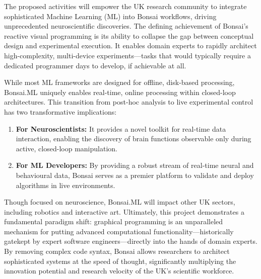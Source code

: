 The proposed activities will empower the UK research community to integrate
sophisticated Machine Learning (ML) into Bonsai workflows, driving
unprecedented neuroscientific discoveries. The defining achievement of Bonsai’s
reactive visual programming is its ability to collapse the gap between
conceptual design and experimental execution. It enables domain experts to
rapidly architect high-complexity, multi-device experiments—tasks that would
typically require a dedicated programmer days to develop, if achievable at all.

While most ML frameworks are designed for offline, disk-based processing,
Bonsai.ML uniquely enables real-time, online processing
within closed-loop architectures. This transition from post-hoc analysis to
live experimental control has two transformative implications:

\begin{enumerate}

    \item \textbf{For Neuroscientists:} It provides a novel toolkit for
        real-time data interaction, enabling the discovery of brain functions
        observable only during active, closed-loop manipulation.

    \item \textbf{For ML Developers:} By providing a robust stream of real-time
        neural and behavioural data, Bonsai serves as a premier platform to
        validate and deploy algorithms in live environments.

\end{enumerate}

Though focused on neuroscience, Bonsai.ML will impact other UK
sectors, including robotics and interactive art. Ultimately, this project
demonstrates a fundamental paradigm shift: graphical programming is an
unparalleled mechanism for putting advanced computational
functionality—historically gatekept by expert software engineers—directly into
the hands of domain experts. By removing complex code syntax, Bonsai allows
researchers to architect sophisticated systems at the speed of thought,
significantly multiplying the innovation potential and research velocity of the
UK’s scientific workforce.

